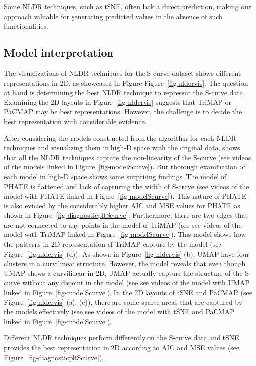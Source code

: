 \documentclass[
  12pt]{article}
\begin{document}
Some NLDR techniques, such as tSNE, often lack a direct prediction,
making our approach valuable for generating predicted values in the
absence of such functionalities.

\hypertarget{model-interpretation}{%
\subsection{Model interpretation}\label{model-interpretation}}

The visualizations of NLDR techniques for the S-curve dataset shows
different representations in 2D, as showcased in Figure
Figure~\ref{fig-nldervis}. The question at hand is determining the best
NLDR technique to represent the S-curve data. Examining the 2D layouts
in Figure~\ref{fig-nldervis} suggests that TriMAP or PaCMAP may be best
representations. However, the challenge is to decide the best
representation with considerable evidence.

After considering the models constructed from the algorithm for each
NLDR techniques and visualizing them in high-D space with the original
data, shows that all the NLDR techniques capture the non-linearity of
the S-curve (see videos of the models linked in
Figure~\ref{fig-modelScurve}). But thorough examination of each model in
high-D space shows some surprising findings. The model of PHATE is
flattened and lack of capturing the width of S-curve (see videos of the
model with PHATE linked in Figure~\ref{fig-modelScurve}). This nature of
PHATE is also evicted by the considerably higher AIC and MSE values for
PHATE as shown in Figure~\ref{fig-diagnosticpltScurve}. Furthermore,
there are two edges that are not connected to any points in the model of
TriMAP (see see videos of the model with TriMAP linked in
Figure~\ref{fig-modelScurve}). This model shows how the patterns in 2D
representation of TriMAP capture by the model (see
Figure~\ref{fig-nldervis} (d)). As shown in Figure~\ref{fig-nldervis}
(b), UMAP have four clusters in a curvilinear structure. However, the
model reveals that even though UMAP shows a curvilinear in 2D, UMAP
actually capture the structure of the S-curve without any disjoint in
the model (see see videos of the model with UMAP linked in
Figure~\ref{fig-modelScurve}). In the 2D layouts of tSNE and PaCMAP (see
Figure~\ref{fig-nldervis} (a), (e)), there are some sparse areas that
are captured by the models effectively (see see videos of the model with
tSNE and PaCMAP linked in Figure~\ref{fig-modelScurve}).

Different NLDR techniques perform differently on the S-curve data and
tSNE provides the best representation in 2D according to AIC and MSE
values (see Figure~\ref{fig-diagnosticpltScurve}).
\end{document}
